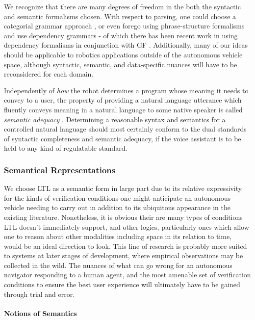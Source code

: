 \documentclass{article}
\begin{document}
We recognize that there are many degrees of freedom in the both the syntactic
and semantic formalisms chosen. With respect to parsing, one could choose a
categorial grammar approach \cite{5152776}, or even forego using
phrase-structure formalisms and use dependency grammars - of which there has
been recent work in using dependency formalisms in conjunction with GF
\cite{ranta2017cross}. Additionally, many of our ideas should be applicable to
robotics applications outside of the autonomous vehicle space, although
syntactic, semantic, and data-specific nuances will have to be reconsidered for
each domain.

Independently of \emph{how} the robot determines a program whose meaning it
needs to convey to a user, the property of providing a natural language
utterance which fluently conveys meaning in a natural language to some native
speaker is called \emph{semantic adequacy} \cite{macmillan2021}. Determining a
reasonable syntax and semantics for a controlled natural language should most
certainly conform to the dual standards of syntactic completeness and semantic
adequacy, if the voice assistant is to be held to any kind of regulatable
standard.


\subsubsection{Semantical Representations}

We choose LTL as a semantic form in large part due to its relative expressivity
for the kinds of verification conditions one might anticipate an autonomous
vehicle needing to carry out in addition to its ubiquitous appearance in the
existing literature. Nonetheless, it is obvious their are many types of
conditions LTL doesn't immediately support, and other logics, particularly ones
which allow one to reason about other modalities including space in its relation
to time, would be an ideal direction to look. This line of research is probably
more suited to systems at later stages of development, where empirical
observations may be collected in the wild. The nuances of what can go wrong for
an autonomous navigator responding to a human agent, and the most amenable set
of verification conditions to ensure the best user experience will ultimately
have to be gained through trial and error.

\paragraph{Notions of Semantics}
\end{document}
